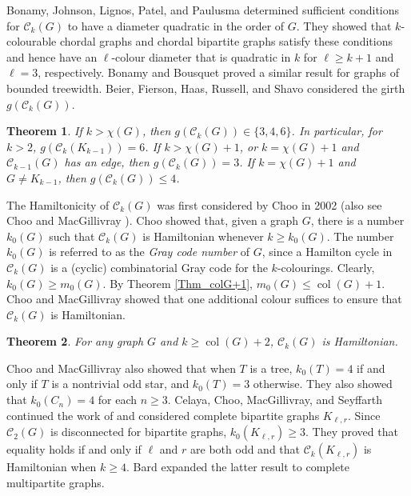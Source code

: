 \documentclass[12pt]{article}%
\newtheorem{theorem}{Theorem}[section]
\begin{document}
Bonamy, Johnson, Lignos, Patel, and Paulusma \cite{26CM-BJLPP} determined
sufficient conditions for $\mathcal{C}_{k}(G)$ to have a diameter quadratic in
the order of $G$. They showed that $k$-colourable chordal graphs and chordal
bipartite graphs satisfy these conditions and hence have an $\ell$-colour
diameter that is quadratic in $k$ for $\ell\geq k+1$ and $\ell=3$,
respectively. Bonamy and Bousquet \cite{26CM-BB} proved a similar result for
graphs of bounded treewidth. Beier, Fierson, Haas, Russell, and Shavo
\cite{26CM-Beier} considered the girth $g(\mathcal{C}_{k}(G))$.

\begin{theorem}
\emph{\cite{26CM-Beier}}\hspace{0.1in}If $k>\chi(G)$, then $g(\mathcal{C}%
_{k}(G))\in\{3,4,6\}$. In particular, for $k>2$, $g(\mathcal{C}_{k}%
(K_{k-1}))=6$. If $k>\chi(G)+1$, or $k=\chi(G)+1$ and $\mathcal{C}_{k-1}(G)$
has an edge, then $g(\mathcal{C}_{k}(G))=3$. If $k=\chi(G)+1$ and $G\neq
K_{k-1}$, then $g(\mathcal{C}_{k}(G))\leq4$.
\end{theorem}



The Hamiltonicity of $\mathcal{C}_{k}(G)$ was first considered by Choo
\cite{26CM-ChooThesis} in 2002 (also see Choo and MacGillivray
\cite{26CM-ChooMacG}). Choo showed that, given a graph $G$, there is a number
$k_{0}(G)$ such that $\mathcal{C}_{k}(G)$ is Hamiltonian whenever $k\geq
k_{0}(G)$. The number $k_{0}(G)$ is referred to as the \emph{Gray code number}
of $G$, since a Hamilton cycle in $\mathcal{C}_{k}(G)$ is a (cyclic)
combinatorial Gray code for the $k$-colourings. Clearly, $k_{0}(G)\geq
m_{0}(G)$. By Theorem \ref{Thm_colG+1}, $m_{0}(G)\leq\operatorname{col}(G)+1$.
Choo and MacGillivray showed that one additional colour suffices to ensure
that $\mathcal{C}_{k}(G)$ is Hamiltonian.

\begin{theorem}
\emph{\cite{26CM-ChooMacG}}\hspace{0.1in}For any graph $G$ and $k\geq
\operatorname{col}(G)+2$, $\mathcal{C}_{k}(G)$ is Hamiltonian.
\end{theorem}

Choo and MacGillivray also showed that when $T$ is a tree, $k_{0}(T)=4$ if and
only if $T$ is a nontrivial odd star, and $k_{0}(T)=3$ otherwise. They also
showed that $k_{0}(C_{n})=4$ for each $n\geq3$. Celaya, Choo, MacGillivray,
and Seyffarth \cite{26CM-CCMS} continued the work of \cite{26CM-ChooMacG} and
considered complete bipartite graphs $K_{\ell,r}$. Since $\mathcal{C}_{2}(G)$
is disconnected for bipartite graphs, $k_{0}(K_{\ell,r})\geq3$. They proved
that equality holds if and only if $\ell$ and $r$ are both odd and that
$\mathcal{C}_{k}(K_{\ell,r})$ is Hamiltonian when $k\geq4$. Bard
\cite{26CM-Bard} expanded the latter result to complete multipartite graphs.
\end{document}
